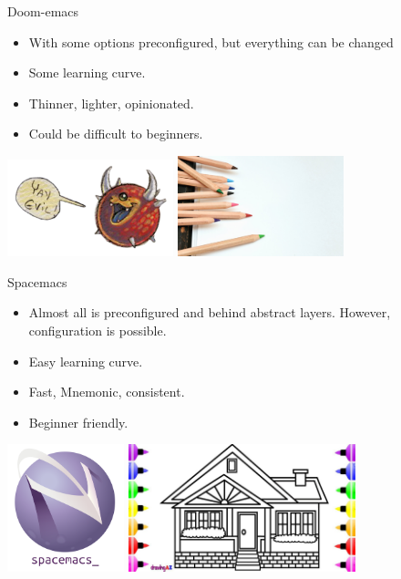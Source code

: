 \documentclass[presentation]{beamer}
\begin{document}
\begin{frame}[label={sec:orgb7b696b}]{Doom-emacs}
\begin{itemize}
\item With some options preconfigured, but everything can be changed
\item Some learning curve.
\item Thinner, lighter, opinionated.
\item Could be difficult to beginners.
\end{itemize}

\begin{center}
\includegraphics[width=13em]{doom.png}
\includegraphics[width=13em]{pencils.png}
\end{center}
\end{frame}


\begin{frame}[label={sec:org2adc6fa}]{Spacemacs}
\begin{itemize}
\item Almost all is preconfigured and behind abstract layers. However, configuration is possible.
\item Easy learning curve.
\item Fast, Mnemonic, consistent.
\item Beginner friendly.
\end{itemize}


\begin{center}
\includegraphics[height=10em]{spacemacs.png}
\includegraphics[height=10em]{kids.png}
\end{center}
\end{frame}
\end{document}
